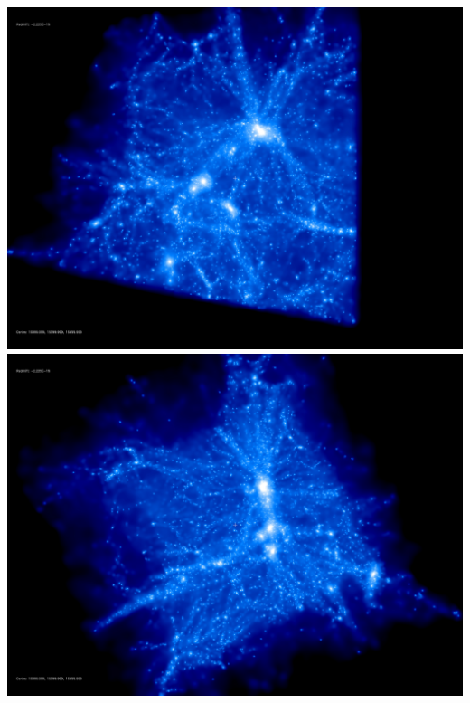 \includegraphics[scale=0.1]{stages_14/rotate_00074.jpg} 
\includegraphics[scale=0.1]{stages_14/rotate_00131.jpg}

